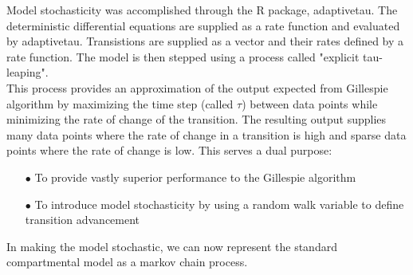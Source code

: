 \documentclass[../Paper.tex]{subfiles}
\begin{document}
\raggedright
Model stochasticity was accomplished through the R package, adaptivetau\cite{johnson_2016}.
The deterministic differential equations are supplied as a rate function and evaluated
by adaptivetau. Transistions are supplied as a vector and their rates defined by
a rate function. The model is then stepped using a process called 
"explicit tau-leaping"\cite{yang_gillespie_petzold_2007}.
\\
This process provides an approximation of the output expected from Gillespie algorithm by maximizing
the time step (called $\tau$) between data points while minimizing the rate of change
of the transition. The resulting output supplies many data points where the rate of
change in a transition is high and sparse data points where the rate
of change is low. This serves a dual purpose:

\begin{enumerate}
  \item[$\bullet$]{To provide vastly superior performance to the Gillespie algorithm}
  \item[$\bullet$]{To introduce model stochasticity by using a random walk variable
                   to define transition advancement}
\end{enumerate}
 
In making the model stochastic, we can now represent the standard compartmental model
as a markov chain process. 
\end{document}
